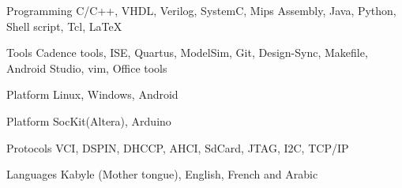 

\begin{cvskills}

  \cvskill
    {Programming} %
    {C/C++, VHDL, Verilog, SystemC, Mips Assembly, Java, Python, Shell script, Tcl, LaTeX} %

  \cvskill
    {Tools} %
    {Cadence tools, ISE, Quartus, ModelSim, Git, Design-Sync, Makefile, Android Studio, vim, Office tools} %

  \cvskill
    {Platform} %
    {Linux, Windows, Android}

  \cvskill
    {Platform} %
    {SocKit(Altera), Arduino}

  \cvskill
    {Protocols} %
    {VCI, DSPIN, DHCCP, AHCI, SdCard, JTAG, I2C, TCP/IP}

  \cvskill
    {Languages} %
    {Kabyle (Mother tongue), English, French and Arabic} %

\end{cvskills}
